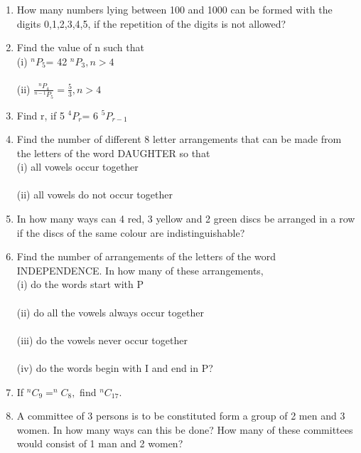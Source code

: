 \begin{enumerate}[label=\arabic*.,ref=\thesubsection.\theenumi]
\item How many numbers lying between 100 and 1000 can be formed with the digits 0,1,2,3,4,5, if the repetition of the digits is not allowed?\\

\item Find the value of n such that\\
(i) $^nP_5 $= 42 $^nP_3, n>4$\\
\\(ii) $\frac{^nP_4}{^{n-1}P_5} = \frac{5}{3}, n>4$\\

\item Find r, if 5 $^4P_r$= 6 $^5P_{r-1}$\\

\item Find the number of different 8 letter arrangements that can be made from the letters of the word DAUGHTER so that\\
(i) all vowels occur together\\
\\(ii) all vowels do not occur together\\

\item In how many ways can 4 red, 3 yellow and 2 green discs be arranged in a row if the discs of the same colour are indistinguishable?\\

\item Find the number of arrangements of the letters of the word INDEPENDENCE. In how many of these arrangements,\\
(i) do the words start with P\\
\\(ii) do all the vowels always occur together\\
\\(iii) do the vowels never occur together\\
\\(iv) do the words begin with I and end in P?\\

\item If $^nC_9 = ^nC_8,$ find $^nC_{17}.$

\item A committee of 3 persons is to be constituted form a group of 2 men and 3 women. In how many ways can this be done? How many of these committees would consist of 1 man and 2 women?\\


\end{enumerate}
